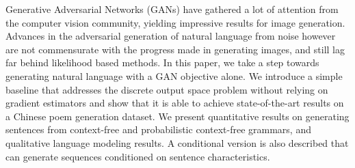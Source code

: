 Generative Adversarial Networks (GANs) have gathered a lot of attention from the computer vision community, yielding impressive results for image generation. Advances in the adversarial generation of natural language from noise however are not commensurate with the progress made in generating images, and still lag far behind likelihood based methods. In this paper, we take a step towards generating natural language  with a GAN objective alone. We introduce a simple baseline that addresses the discrete output space problem without relying on gradient estimators and show that it is able to achieve state-of-the-art results on a Chinese poem generation dataset. We present quantitative results on generating sentences from context-free and probabilistic context-free grammars, and qualitative language modeling results. A conditional version is also described that can generate sequences conditioned on sentence characteristics.
